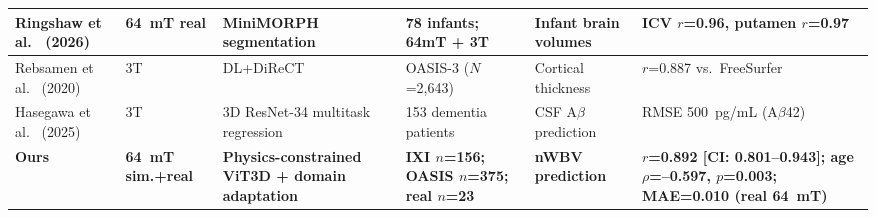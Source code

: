 \begin{table}[!t]
\begin{tabular}{|p{3.2cm}|p{1.4cm}|p{2.2cm}|p{2.4cm}|p{2.4cm}|p{2.6cm}|}
\hline
Ringshaw et al.~\cite{ringshaw2026infant} (2026) & 64~mT real & MiniMORPH segmentation & 78 infants; 64mT + 3T & Infant brain volumes & ICV $r$=0.96, putamen $r$=0.97 \\
\hline
Rebsamen et al.~\cite{rebsamen2020corticalthickness} (2020) & 3T & DL+DiReCT & OASIS-3 ($N$=2,643) & Cortical thickness & $r$=0.887 vs.\ FreeSurfer \\
\hline
Hasegawa et al.~\cite{hasegawa2025biomarker} (2025) & 3T & 3D ResNet-34 multitask regression & 153 dementia patients & CSF A$\beta$ prediction & RMSE 500~pg/mL (A$\beta$42) \\
\hline
\textbf{Ours} & \textbf{64~mT sim.+real} & \textbf{Physics-constrained ViT3D + domain adaptation} & \textbf{IXI $n$=156; OASIS $n$=375; real $n$=23} & \textbf{nWBV prediction} & \textbf{$r$=0.892 [CI: 0.801--0.943]; age $\rho$=--0.597, $p$=0.003; MAE=0.010 (real 64~mT)} \\
\hline
\end{tabular}
\end{table}

